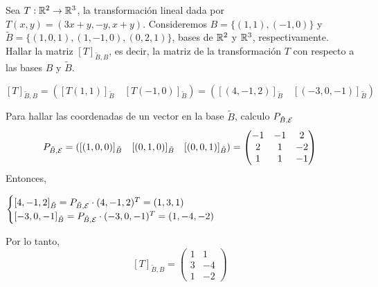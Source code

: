 \item Sea $T:\mathbb{R}^2\to\mathbb{R}^3$, la transformación lineal dada por $T(x,y)=(3x+y,-y,x+y)$. Consideremos $B=\{(1,1),(-1,0)\}$ y $\tilde{B}=\{(1,0,1),(1,-1,0),(0,2,1)\}$, bases de $\mathbb{R}^2$ y $\mathbb{R}^3$, respectivamente. Hallar la matriz $[T]_{\tilde{B},B}$, es decir, la matriz de la transformación $T$ con respecto a las bases $B$ y $\tilde{B}$.
    \begin{mdframed}[style=s]
        \begin{center}
            $[T]_{\tilde{B},B}=\left([T(1,1)]_{\tilde{B}}\quad[T(-1,0)]_{\tilde{B}}\right)=\left([(4,-1,2)]_{\tilde{B}}\quad[(-3,0,-1)]_{\tilde{B}}\right)$
        \end{center}
        Para hallar las coordenadas de un vector en la base $\tilde{B}$, calculo $P_{\tilde{B},\mathcal{E}}$
        \[P_{\tilde{B},\mathcal{E}}=\left([(1,0,0)]_{\tilde{B}}\quad[(0,1,0)]_{\tilde{B}}\quad[(0,0,1)]_{\tilde{B}}\right)=\begin{pmatrix}
            -1&-1&2\\2&1&-2\\1&1&-1
        \end{pmatrix}\]
        Entonces,
        \begin{center}
            $\begin{cases}
                [4,-1,2]_{\tilde{B}}=P_{\tilde{B},\mathcal{E}}\cdot(4,-1,2)^T=(1,3,1)\\
                [-3,0,-1]_{\tilde{B}}=P_{\tilde{B},\mathcal{E}}\cdot(-3,0,-1)^T=(1,-4,-2)
            \end{cases}$
        \end{center}
        Por lo tanto,
        \[[T]_{\tilde{B},B}=\begin{pmatrix}
            1&1\\3&-4\\1&-2
        \end{pmatrix}\]
    \end{mdframed}
